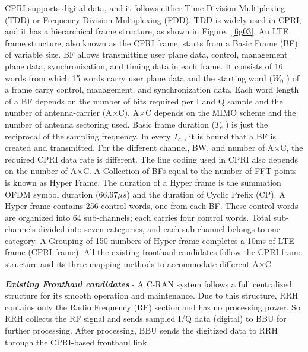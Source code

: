 \begin{multicols}{2}
CPRI supports digital data, and it follows either Time Division Multiplexing (TDD) or Frequency Division Multiplexing (FDD). TDD is widely used in CPRI, and it has a hierarchical frame structure, as shown in Figure.~\ref{fig03}. An LTE frame structure, also known as the CPRI frame, starts from a Basic Frame (BF) of variable size. BF allows transmitting user plane data, control, management plane data, synchronization, and timing data in each frame. It consists of 16 words from which 15 words carry user plane data and the starting word ($W_{0}$ ) of a  frame carry control, management, and synchronization data. Each word length of a BF depends on the number of bits required per I and Q sample and the number of antenna-carrier (A$\times$C). A$\times$C depends on the MIMO scheme and the number of antenna sectoring used. Basic frame duration ($T_{c}$ ) is just the reciprocal of the sampling frequency. In every $T_{c}$ , it is bound that a BF is created and transmitted. For the different channel, BW, and number of A$\times$C, the required CPRI data rate is different. The line coding used in CPRI also depends on the number of A$\times$C. A Collection of BFs equal to the number of FFT points is known as Hyper Frame. The duration of a Hyper frame is the summation OFDM symbol duration ($66.67 \mu s$) and the duration of Cyclic Prefix (CP). A Hyper frame contains 256 control words, one from each BF. These control words are organized into 64 sub-channels; each carries four control words. Total sub-channels divided into seven categories, and each sub-channel belongs to one category. A Grouping of 150 numbers of Hyper frame completes a 10ms of LTE frame (CPRI frame). All the existing fronthaul candidates follow the CPRI frame structure and its three mapping methods to accommodate different A$\times$C

\textit{\textbf {Existing Fronthaul candidates}} - A C-RAN system follows a full centralized structure for its smooth operation and maintenance. Due to this structure, RRH contains only the Radio Frequency (RF) section and has no processing power. So RRH collects the RF signal and sends sampled I/Q data (digital) to BBU for further processing. After processing, BBU sends the digitized data to RRH through the CPRI-based fronthaul link.


\end{multicols}
